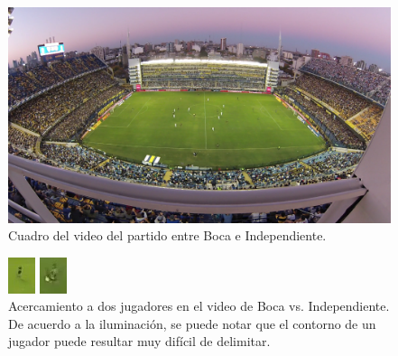 \begin{figure}[H]
  \centering
  \includegraphics[width=\linewidth]{./images/boca-figura.png}
  \caption{Cuadro del video del partido entre Boca e Independiente.}
  \label{fig:boca-figura}
\end{figure}
\begin{figure}[H]
    \centering
    \captionsetup{justification=centering}
    \begin{minipage}[t]{.5\textwidth}
        \centering
        \includegraphics[width=.4\linewidth]{./images/boca-dificil1.png}
    \end{minipage}%
    \begin{minipage}[t]{.5\textwidth}
        \centering
        \includegraphics[width=.4\linewidth]{./images/boca-dificil2.png}
    \end{minipage}
    \caption{Acercamiento a dos jugadores en el video de Boca vs.
             Independiente. De acuerdo a la iluminación, se puede notar que el
             contorno de un jugador puede resultar muy difícil de delimitar.
        \label{fig:boca-dificil-1}}

\end{figure}
